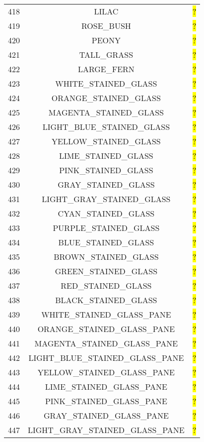 \documentclass[11pt]{article}
\newcommand\myworries[1]{\sethlcolor{red}\hl{#1}}
\begin{document}
\begin{longtable}{ |c|c|c| }
	418 & LILAC & \myworries{?} \\
	419 & ROSE\_BUSH & \myworries{?} \\
	420 & PEONY & \myworries{?} \\
	421 & TALL\_GRASS & \myworries{?} \\
	422 & LARGE\_FERN & \myworries{?} \\
	423 & WHITE\_STAINED\_GLASS & \myworries{?} \\
	424 & ORANGE\_STAINED\_GLASS & \myworries{?} \\
	425 & MAGENTA\_STAINED\_GLASS & \myworries{?} \\
	426 & LIGHT\_BLUE\_STAINED\_GLASS & \myworries{?} \\
	427 & YELLOW\_STAINED\_GLASS & \myworries{?} \\
	428 & LIME\_STAINED\_GLASS & \myworries{?} \\
	429 & PINK\_STAINED\_GLASS & \myworries{?} \\
	430 & GRAY\_STAINED\_GLASS & \myworries{?} \\
	431 & LIGHT\_GRAY\_STAINED\_GLASS & \myworries{?} \\
	432 & CYAN\_STAINED\_GLASS & \myworries{?} \\
	433 & PURPLE\_STAINED\_GLASS & \myworries{?} \\
	434 & BLUE\_STAINED\_GLASS & \myworries{?} \\
	435 & BROWN\_STAINED\_GLASS & \myworries{?} \\
	436 & GREEN\_STAINED\_GLASS & \myworries{?} \\
	437 & RED\_STAINED\_GLASS & \myworries{?} \\
	438 & BLACK\_STAINED\_GLASS & \myworries{?} \\
	439 & WHITE\_STAINED\_GLASS\_PANE & \myworries{?} \\
	440 & ORANGE\_STAINED\_GLASS\_PANE & \myworries{?} \\
	441 & MAGENTA\_STAINED\_GLASS\_PANE & \myworries{?} \\
	442 & LIGHT\_BLUE\_STAINED\_GLASS\_PANE & \myworries{?} \\
	443 & YELLOW\_STAINED\_GLASS\_PANE & \myworries{?} \\
	444 & LIME\_STAINED\_GLASS\_PANE & \myworries{?} \\
	445 & PINK\_STAINED\_GLASS\_PANE & \myworries{?} \\
	446 & GRAY\_STAINED\_GLASS\_PANE & \myworries{?} \\
	447 & LIGHT\_GRAY\_STAINED\_GLASS\_PANE & \myworries{?} \\

\end{longtable}
\end{document}
